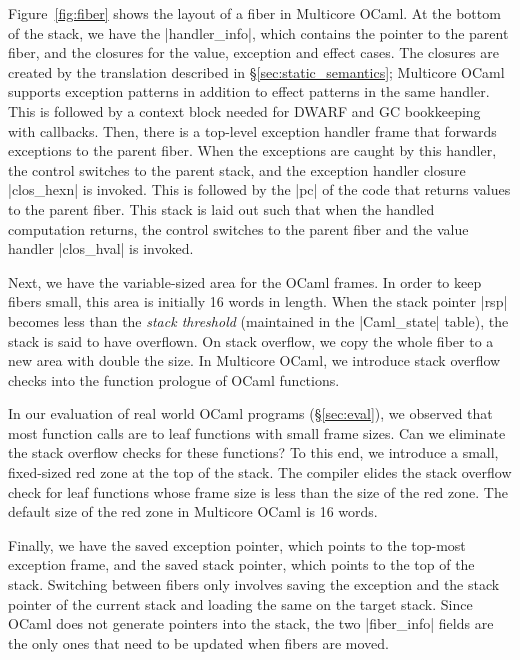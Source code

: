 \documentclass[sigplan,10pt,review,anonymous]{acmart}\settopmatter{printfolios=true,printccs=false,printacmref=false}
\begin{document}
Figure~\ref{fig:fiber} shows the layout of a fiber in Multicore OCaml. At the
bottom of the stack, we have the |handler_info|, which contains the pointer to
the parent fiber, and the closures for the value, exception and effect cases.
The closures are created by the translation described in
\S\ref{sec:static_semantics}; Multicore OCaml supports exception patterns in
addition to effect patterns in the same handler. This is followed by a context
block needed for DWARF and GC bookkeeping with callbacks. Then, there is a
top-level exception handler frame that forwards exceptions to the parent fiber.
When the exceptions are caught by this handler, the control switches to the
parent stack, and the exception handler closure |clos_hexn| is invoked. This is
followed by the |pc| of the code that returns values to the parent
fiber. This stack is laid out such that when the handled computation returns,
the control switches to the parent fiber and the value handler |clos_hval|
is invoked.

Next, we have the variable-sized area for the OCaml frames. In order to keep
fibers small, this area is initially 16 words in length. When the stack pointer
|rsp| becomes less than the \emph{stack threshold} (maintained in the
|Caml_state| table), the stack is said to have overflown. On stack overflow, we
copy the whole fiber to a new area with double the size. In Multicore OCaml, we
introduce stack overflow checks into the function prologue of OCaml functions.

In our evaluation of real world OCaml programs (\S\ref{sec:eval}), we observed
that most function calls are to leaf functions with small frame sizes. Can we
eliminate the stack overflow checks for these functions? To this end, we
introduce a small, fixed-sized red zone at the top of the stack. The compiler
elides the stack overflow check for leaf functions whose frame size is less
than the size of the red zone. The default size of the red zone in Multicore
OCaml is 16 words.

Finally, we have the saved exception pointer, which points to the top-most
exception frame, and the saved stack pointer, which points to the top of the
stack. Switching between fibers only involves saving the exception and the
stack pointer of the current stack and loading the same on the target stack.
Since OCaml does not generate pointers into the stack, the two |fiber_info|
fields are the only ones that need to be updated when fibers are moved.

\vspace{-3mm}
\end{document}
